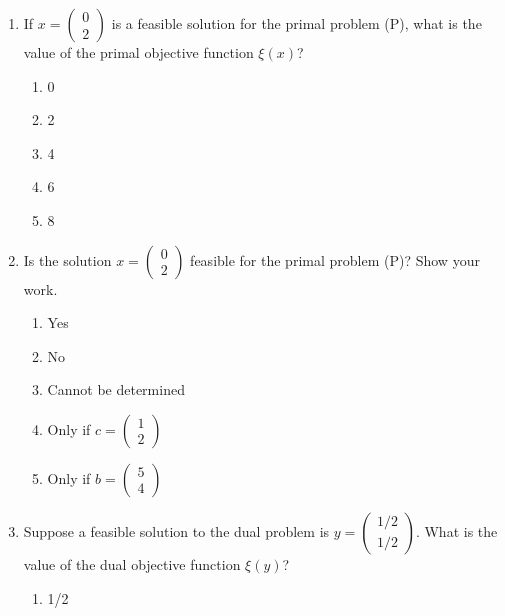 \documentclass{article}%
\begin{document}
\begin{enumerate}
\begin{enumerate}
\begin{enumerate}
\item $\min \quad \xi(y) = 2y_1 + y_2$ subject to $y_1 + 3y_2 \geq 4$, $2y_1 + y_2 \geq 5$, $y_1, y_2 \geq 0$%
\item $\min \quad \xi(y) = 5y_1 + 4y_2$ subject to $3y_1 + y_2 \geq 2$, $y_1 + 2y_2 \geq 1$, $y_1, y_2 \geq 0$%
\end{enumerate}%
\vspace{0.5em}%
\item If $x = \begin{pmatrix} 0 \\ 2 \end{pmatrix}$ is a feasible solution for the primal problem (P), what is the value of the primal objective function $\xi(x)$?%
\begin{enumerate}%
\item 0%
\item 2%
\item 4%
\item 6%
\item 8%
\end{enumerate}%
\vspace{0.5em}%
\item Is the solution $x = \begin{pmatrix} 0 \\ 2 \end{pmatrix}$ feasible for the primal problem (P)?  Show your work.%
\begin{enumerate}%
\item Yes%
\item No%
\item Cannot be determined%
\item Only if $c = \begin{pmatrix} 1 \\ 2 \end{pmatrix}$%
\item Only if $b = \begin{pmatrix} 5 \\ 4 \end{pmatrix}$%
\end{enumerate}%
\vspace{0.5em}%
\item Suppose a feasible solution to the dual problem is $y = \begin{pmatrix} 1/2 \\ 1/2 \end{pmatrix}$. What is the value of the dual objective function $\xi(y)$?%
\begin{enumerate}%
\item 1/2%

\end{enumerate}
\end{enumerate}
\end{enumerate}
\end{document}
